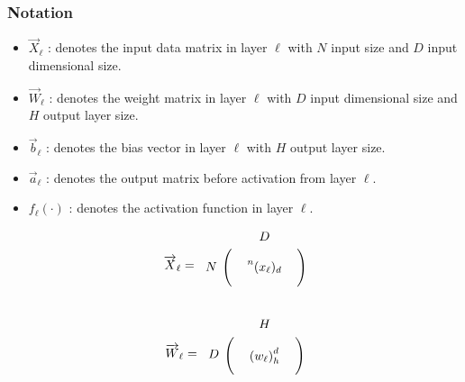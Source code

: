 \documentclass[12pt,a4paper]{article}%
\theoremstyle{definition}
\theoremstyle{plain}
\numberwithin{equation}{section}
\begin{document}
\subsubsection{Notation}
\begin{itemize}
\item $\overrightarrow{X}_{\ell}$ : denotes the input data matrix in layer $\ell$ with $N$ input size and $D$ input dimensional size.  
\item $\overrightarrow{W}_{\ell}$ : denotes the weight matrix in layer $\ell$ with $D$ input dimensional size and $H$ output layer size.
\item $\vec{b}_{\ell}$ : denotes the bias vector in layer $\ell$ with $H$ output layer size.
\item $\overrightarrow{a}_{\ell}$ : denotes the output matrix before activation from layer $\ell$.
\item $f_{\ell}(\cdot)$ : denotes the activation function in layer $\ell$. 
\end{itemize}

\begin{equation*}
\overrightarrow{X}_{\ell} =  \begin{blockarray}{cccc}
                                     & \multicolumn{3}{c}{$D$}  \\
\begin{block}{c(ccc)}
\multirow{3}{*}{$N$} &    &       &    \\
  					                 &      &  \prescript{n}{}{(x_{\ell})}_{d}     &     \\
			     	                 &      &       &       \\
\end{block}
\end{blockarray}
\end{equation*}

\begin{equation*}
\overrightarrow{W}_{\ell} =  \begin{blockarray}{cccc}
                                     & \multicolumn{3}{c}{$H$}  \\
\begin{block}{c(ccc)}
\multirow{3}{*}{$D$} &    &       &    \\
  					                 &      &  {(w_{\ell})}^{d}_{h}     &     \\
			     	                 &      &       &       \\
\end{block}
\end{blockarray}
\end{equation*}
\end{document}

